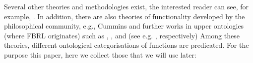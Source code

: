 \documentclass[
]{ceurart}
\begin{document}
Several other theories and methodologies exist, 
the interested reader can see, for example, \cite{umedaFunctionBehaviourStructure1990,qianFunctionBehaviorStructure1996, zhaoStateBehaviorFunction2019}.
In addition, there are also theories of functionality developed by the philosophical community, e.g., Cummins \cite{cumminsFunctionalAnalysis1975} and further works in upper ontologies (where FBRL originates) such as \BFO, \GFO, \YAMATO and \DOLCE (see e.g. \cite{spearFunctionsBasicFormal2016, herreGeneralFormalOntology2006, sasajimaFBRLFunctionBehavior1995, borgoFormalOntologicalPerspective2009}, respectively)
Among these theories, different ontological categorisations of functions are predicated. 
For the purpose this paper, here we collect those that we will use later:
\end{document}
